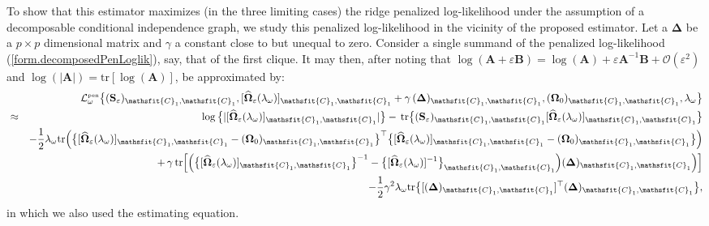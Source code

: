 To show that this estimator maximizes (in the three limiting cases) the ridge penalized log-likelihood under the assumption of a decomposable conditional independence graph, we study this penalized log-likelihood in the vicinity of the proposed estimator. Let a $\mathbf{\Delta}$ be a $p \times p$ dimensional matrix and $\gamma$ a constant close to but unequal to zero. Consider a single summand of the penalized log-likelihood (\ref{form.decomposedPenLoglik}), say, that of the first clique. It may then, after noting that $\log(\mathbf{A} + \varepsilon \mathbf{B}) = \log( \mathbf{A}) + \varepsilon \mathbf{A}^{-1} \mathbf{B} + \mathcal{O}(\varepsilon^2)$ and $\log( | \mathbf{A} |)  = \mbox{tr} [ \log(\mathbf{A})]$, be approximated by:
\begin{eqnarray*}
& & \hspace{-1cm} \mathcal{L}^{\mbox{{\tiny pen}}}_{\omega} \big\{ (\mathbf{S}_{\varepsilon})_{\mathsfit{C}_1,\mathsfit{C}_1}, [\widehat{\mathbf{\Omega}}_{\varepsilon}(\lambda_{\omega}) ]_{\mathsfit{C}_1,\mathsfit{C}_1} + \gamma \, (\mathbf{\Delta})_{\mathsfit{C}_1,\mathsfit{C}_1}, (\mathbf{\Omega}_{0})_{\mathsfit{C}_1,\mathsfit{C}_1}, \lambda_{\omega} \big\}
\\
& \approx & \log \big\{ | [\widehat{\mathbf{\Omega}}_{\varepsilon}(\lambda_{\omega}) ]_{\mathsfit{C}_1,\mathsfit{C}_1} | \big\}
 - \, \mbox{tr}  \big\{ (\mathbf{S}_{\varepsilon})_{\mathsfit{C}_1,\mathsfit{C}_1}  [\widehat{\mathbf{\Omega}}_{\varepsilon}(\lambda_{\omega})]_{\mathsfit{C}_1,\mathsfit{C}_1} \big\}
\\
& &
- \frac{1}{2} \lambda_{\omega} \mbox{tr}  \Big(  \big\{ [\widehat{\mathbf{\Omega}}_{\varepsilon}(\lambda_{\omega})]_{\mathsfit{C}_1,\mathsfit{C}_1} - (\mathbf{\Omega}_{0})_{\mathsfit{C}_1,\mathsfit{C}_1} \big\}^{\top} \big\{ [\widehat{\mathbf{\Omega}}_{\varepsilon}(\lambda_{\omega})]_{\mathsfit{C}_1,\mathsfit{C}_1} - (\mathbf{\Omega}_{0})_{\mathsfit{C}_1,\mathsfit{C}_1} \big\} \Big)
\\
& & + \, \gamma \, \mbox{tr} \Big[ \Big(
\big\{ [\widehat{\mathbf{\Omega}}_{\varepsilon}(\lambda_{\omega})]_{\mathsfit{C}_1,\mathsfit{C}_1} \big\}^{-1} -
\big\{ [\widehat{\mathbf{\Omega}}_{\varepsilon}(\lambda_{\omega})]^{-1} \big\}_{\mathsfit{C}_1,\mathsfit{C}_1}
\Big) ( \mathbf{\Delta})_{\mathsfit{C}_1,\mathsfit{C}_1} \Big) \Big]
\\
& & - \frac{1}{2} \gamma^2 \lambda_{\omega} \mbox{tr}  \big\{  [  (\mathbf{\Delta})_{\mathsfit{C}_1,\mathsfit{C}_1} ]^{\top}  ( \mathbf{\Delta})_{\mathsfit{C}_1,\mathsfit{C}_1}  \big\},
\end{eqnarray*}
in which we also used the estimating equation.

